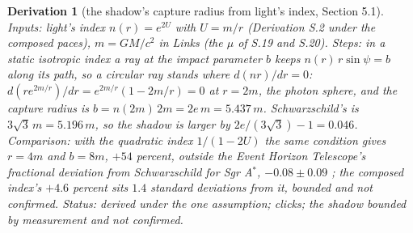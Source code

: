 \documentclass[pdflatex,sn-mathphys-num]{sn-jnl}
\theoremstyle{thmstyleone}
\newtheorem{derivation}{Derivation}
\begin{document}
\begin{derivation}[the shadow's capture radius from light's index, Section 5.1]
\emph{Inputs:} light's index $n(r) = e^{2U}$ with $U = m / r$ (Derivation S.2 under the composed paces), $m = GM / c^2$ in Links (the $\mu$ of S.19 and S.20). \emph{Steps:} in a static isotropic index a ray at the impact parameter $b$ keeps $n(r)\,r\sin\psi = b$ along its path, so a circular ray stands where $d(n r) / dr = 0$: $d(r e^{2m / r}) / dr = e^{2m / r}(1 - 2m / r) = 0$ at $r = 2m$, the photon sphere, and the capture radius is $b = n(2m)\,2m = 2e\,m = 5.437\,m$. Schwarzschild's is $3\sqrt 3\,m = 5.196\,m$, so the shadow is larger by $2e / (3\sqrt 3) - 1 = 0.046$. \emph{Comparison:} with the quadratic index $1 / (1 - 2U)$ the same condition gives $r = 4m$ and $b = 8m$, $+54$ percent, outside the Event Horizon Telescope's fractional deviation from Schwarzschild for Sgr A$^*$, $-0.08 \pm 0.09$ \cite{eht_sgra}; the composed index's $+4.6$ percent sits $1.4$ standard deviations from it, bounded and not confirmed.
 \emph{Status:} derived under the one assumption; clicks; the shadow bounded by measurement and not confirmed.
\end{derivation}
\end{document}

